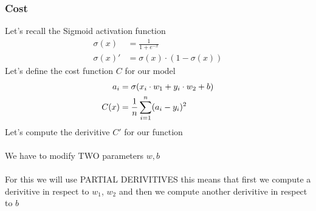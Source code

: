 \documentclass{article}
\begin{document}
\subsubsection{Cost}
Let's recall the Sigmoid activation function  
\begin{align}
    \sigma(x)  &= \frac{1}{1 + e^{-x}} \\ 
    \sigma(x)' &= \sigma(x) \cdot (1 - \sigma(x)) 
\end{align}
Let's define the cost function $C$ for our model
\begin{align}
    a_i  &= \sigma(x_i \cdot w_1 + y_i \cdot w_2 + b) \\ 
    C(x) &= \avgsum[i, n](a_i - y_i)^2 
\end{align}
Let's compute the derivitive $C'$ for our function\\
\\
We have to modify TWO parameters $w, b$\\
\\
For this we will use PARTIAL DERIVITIVES this means that first we compute a derivitive in respect to $w_1$, $w_2$ and then we compute another derivitive in respect to $b$ \\
\def\pd[#1]{\partial_{#1}}
\end{document}
